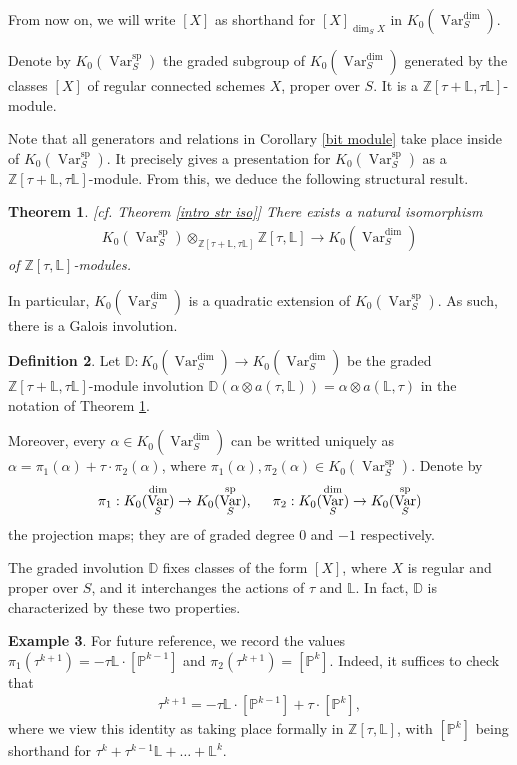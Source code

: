 \documentclass{amsart}
\newtheorem{thm}{Theorem}[section]
\theoremstyle{definition}
\newtheorem{defn}[thm]{Definition}
\newtheorem{exmp}[thm]{Example}
\DeclareMathOperator{\Var}{Var}
\DeclareMathOperator{\spr}{sp}
\newcommand{\KdimS}{K_0(\Var_S^{\dim})}
\newcommand{\KsprS}{K_0(\Var_S^{\spr})}
\numberwithin{equation}{section}
\begin{document}
From now on, we will write $[X]$ as shorthand for $[X]_{\dim_S X}$ in $\KdimS$.

Denote by $\KsprS$ the graded subgroup of $\KdimS$ generated by the classes $[X]$ of regular connected schemes $X$, proper over $S$. It is a $\mathbb{Z}[\tau+\mathbb{L}, \tau \mathbb{L}]$-module.

Note that all generators and relations in Corollary \ref{bit module} take place inside of $\KsprS$. It precisely gives a presentation for $\KsprS$ as a $\mathbb{Z}[\tau+\mathbb{L}, \tau \mathbb{L}]$-module. From this, we deduce the following structural result.


\begin{thm}\label{str iso}[cf. Theorem \ref{intro str iso}]
There exists a natural isomorphism
\begin{align*}
    \KsprS \otimes_{\mathbb{Z}[\tau + \mathbb{L}, \tau \mathbb{L}]} \mathbb{Z}[\tau, \mathbb{L}] \rightarrow \KdimS
\end{align*}
of $\mathbb{Z}[\tau, \mathbb{L}]$-modules.
\end{thm}

In particular, $\KdimS$ is a quadratic extension of $\KsprS$. As such, there is a Galois involution.

\begin{defn}
Let $\mathbb{D}: \KdimS \rightarrow \KdimS$ be the graded $\mathbb{Z}[\tau+ \mathbb{L}, \tau \mathbb{L}]$-module involution $\mathbb{D}(\alpha \otimes a(\tau, \mathbb{L}) ) = \alpha \otimes a(\mathbb{L}, \tau)$ in the notation of Theorem \ref{str iso}.

Moreover, every $\alpha \in \KdimS$ can be writted uniquely as $\alpha = \pi_1(\alpha) + \tau \cdot \pi_2(\alpha)$, where $\pi_1(\alpha), \pi_2(\alpha) \in \KsprS$. Denote by
\begin{align*}
    \pi_1: \KdimS \rightarrow \KsprS, \hspace{.5cm} \pi_2: \KdimS \rightarrow \KsprS
\end{align*}
the projection maps; they are of graded degree $0$ and $-1$ respectively.
\end{defn}

The graded involution $\mathbb{D}$ fixes classes of the form $[X]$, where $X$ is regular and proper over $S$, and it interchanges the actions of $\tau$ and $\mathbb{L}$. In fact, $\mathbb{D}$ is characterized by these two properties.

\begin{exmp}\label{P^k example}
For future reference, we record the values $\pi_1(\tau^{k+1}) = -\tau \mathbb{L} \cdot [\mathbb{P}^{k-1}]$ and $\pi_2(\tau^{k+1}) = [\mathbb{P}^{k}]$. Indeed, it suffices to check that
\begin{align*}
    \tau^{k+1} = -\tau \mathbb{L} \cdot [\mathbb{P}^{k-1}] + \tau \cdot [\mathbb{P}^{k}],
\end{align*}
where we view this identity as taking place formally in $\mathbb{Z}[\tau, \mathbb{L}]$, with $[\mathbb{P}^k]$ being shorthand for $\tau^k + \tau^{k-1}\mathbb{L} + \ldots + \mathbb{L}^k$.
\end{exmp}
\end{document}
